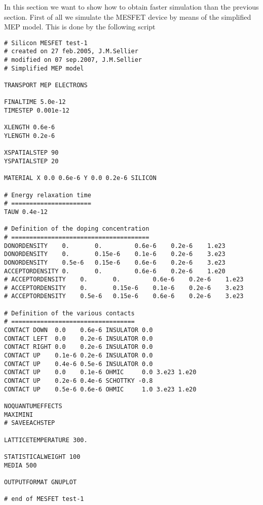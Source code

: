 \documentclass[12pt]{book}
\begin{document}
In this section we want to show how to obtain faster simulation than the previous section. First of all we simulate the MESFET device by means of the simplified MEP model. This is done by the following script
\begin{verbatim}
# Silicon MESFET test-1
# created on 27 feb.2005, J.M.Sellier
# modified on 07 sep.2007, J.M.Sellier
# Simplified MEP model

TRANSPORT MEP ELECTRONS

FINALTIME 5.0e-12
TIMESTEP 0.001e-12

XLENGTH 0.6e-6
YLENGTH 0.2e-6

XSPATIALSTEP 90
YSPATIALSTEP 20

MATERIAL X 0.0 0.6e-6 Y 0.0 0.2e-6 SILICON

# Energy relaxation time
# ======================
TAUW 0.4e-12

# Definition of the doping concentration
# ======================================
DONORDENSITY    0.       0.         0.6e-6    0.2e-6    1.e23
DONORDENSITY    0.       0.15e-6    0.1e-6    0.2e-6    3.e23
DONORDENSITY    0.5e-6   0.15e-6    0.6e-6    0.2e-6    3.e23
ACCEPTORDENSITY 0.       0.         0.6e-6    0.2e-6    1.e20
# ACCEPTORDENSITY    0.       0.         0.6e-6    0.2e-6    1.e23
# ACCEPTORDENSITY    0.       0.15e-6    0.1e-6    0.2e-6    3.e23
# ACCEPTORDENSITY    0.5e-6   0.15e-6    0.6e-6    0.2e-6    3.e23

# Definition of the various contacts
# ==================================
CONTACT DOWN  0.0    0.6e-6 INSULATOR 0.0
CONTACT LEFT  0.0    0.2e-6 INSULATOR 0.0
CONTACT RIGHT 0.0    0.2e-6 INSULATOR 0.0
CONTACT UP    0.1e-6 0.2e-6 INSULATOR 0.0
CONTACT UP    0.4e-6 0.5e-6 INSULATOR 0.0
CONTACT UP    0.0    0.1e-6 OHMIC     0.0 3.e23 1.e20
CONTACT UP    0.2e-6 0.4e-6 SCHOTTKY -0.8
CONTACT UP    0.5e-6 0.6e-6 OHMIC     1.0 3.e23 1.e20

NOQUANTUMEFFECTS
MAXIMINI
# SAVEEACHSTEP

LATTICETEMPERATURE 300.

STATISTICALWEIGHT 100
MEDIA 500

OUTPUTFORMAT GNUPLOT

# end of MESFET test-1

\end{verbatim}
\end{document}
